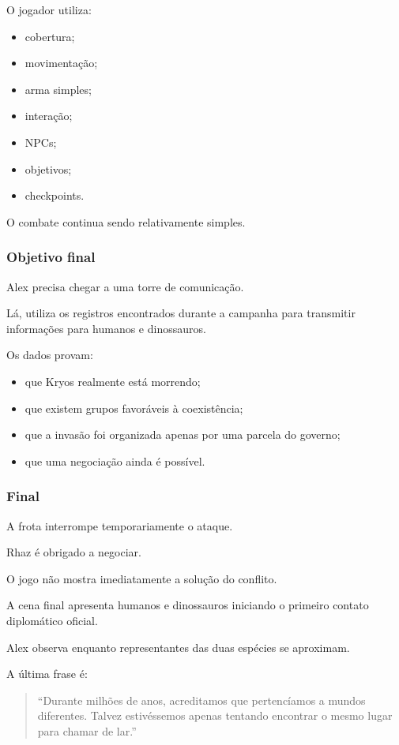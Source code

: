 \documentclass[12pt,a4paper]{article}
\begin{document}
O jogador utiliza:

\begin{itemize}
    \item cobertura;
    \item movimentação;
    \item arma simples;
    \item interação;
    \item NPCs;
    \item objetivos;
    \item checkpoints.
\end{itemize}

O combate continua sendo relativamente simples.

\subsubsection*{Objetivo final}

Alex precisa chegar a uma torre de comunicação.

Lá, utiliza os registros encontrados durante a campanha para transmitir
informações para humanos e dinossauros.

Os dados provam:

\begin{itemize}
    \item que Kryos realmente está morrendo;
    \item que existem grupos favoráveis à coexistência;
    \item que a invasão foi organizada apenas por uma parcela do governo;
    \item que uma negociação ainda é possível.
\end{itemize}

\subsubsection*{Final}

A frota interrompe temporariamente o ataque.

Rhaz é obrigado a negociar.

O jogo não mostra imediatamente a solução do conflito.

A cena final apresenta humanos e dinossauros iniciando o primeiro
contato diplomático oficial.

Alex observa enquanto representantes das duas espécies se aproximam.

A última frase é:

\begin{quote}
``Durante milhões de anos, acreditamos que pertencíamos a mundos
diferentes. Talvez estivéssemos apenas tentando encontrar o mesmo
lugar para chamar de lar.''
\end{quote}
\end{document}
